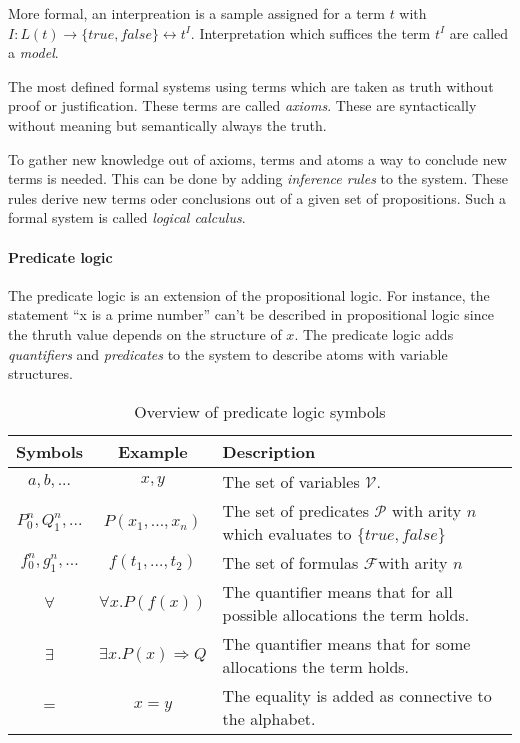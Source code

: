 \begin{defi}
  More formal, an interpreation is a sample assigned for a term $t$ with
  $I:L(t)\rightarrow \{true,false\} \leftrightarrow t^I$. Interpretation which suffices the term
  $t^I$ are called a \textit{model}.
\end{defi}

The most defined formal systems using terms which are taken as truth without
proof or justification. These terms are called \textit{axioms}. These are syntactically
without meaning but semantically always the truth.~\cite{tuschik1994mathematische}

To gather new knowledge out of axioms, terms and atoms a way to conclude
new terms is needed. This can be done by adding \textit{inference rules} to
the system. These rules derive new terms oder conclusions out of a given
set of propositions. Such a formal system is called \textit{logical calculus}.~\cite{tuschik1994mathematische}

\paragraph{Predicate logic}
The predicate logic is an extension of the propositional logic.
For instance, the statement ``x is a prime number'' can't be described
in propositional logic since the thruth value depends on the structure of $x$.
The predicate logic adds \textit{quantifiers} and \textit{predicates} to the
system to describe atoms with variable structures.~\cite{heinemann2013logik}

\begin{table}[h]
  \centering
  \begin{tabular}{c|c|l}
    Symbols & Example & Description\\\hline
    $a,b,...$ & $x,y$ & The set of variables $\mathcal{V}$.\\
    $P_0^n,Q_1^n,...$ & $P(x_1,...,x_n)$ & The set of predicates $\mathcal{P}$ with arity $n$
                                          which evaluates to $\{true,false\}$\\
    $f_0^n,g_1^n,...$ & $f(t_1,...,t_2)$ & The set of formulas $\mathcal{F}$with arity $n$\\
    $\forall$ & $\forall x.P(f(x))$ & The quantifier means that for all possible allocations the term holds.\\
    $\exists$ & $\exists x.P(x)\Rightarrow Q$ & The quantifier means that for some allocations the term holds.\\
    $=$ & $x = y$ & The equality is added as connective to the alphabet.\\
  \end{tabular}
  \caption{Overview of predicate logic symbols}
  \label{tab:predlogic}
\end{table}

